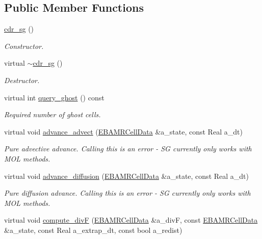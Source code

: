 \subsection*{Public Member Functions}
\begin{DoxyCompactItemize}
\item 
\hyperlink{classcdr__sg_a713c1b0970e68f90ddd7215e846f69a8}{cdr\+\_\+sg} ()
\begin{DoxyCompactList}\small\item\em Constructor. \end{DoxyCompactList}\item 
virtual \hyperlink{classcdr__sg_a507b966f96d85af4cc84c1f7e81f5f1a}{$\sim$cdr\+\_\+sg} ()
\begin{DoxyCompactList}\small\item\em Destructor. \end{DoxyCompactList}\item 
virtual int \hyperlink{classcdr__sg_abecf3d6b57505ca18e33bbbe25ad4de1}{query\+\_\+ghost} () const 
\begin{DoxyCompactList}\small\item\em Required number of ghost cells. \end{DoxyCompactList}\item 
virtual void \hyperlink{classcdr__sg_a3471b189df0a8a66e795b53426d6253f}{advance\+\_\+advect} (\hyperlink{type__definitions_8H_a7e610f301989e5e07781c5e338bdb7c3}{E\+B\+A\+M\+R\+Cell\+Data} \&a\+\_\+state, const Real a\+\_\+dt)
\begin{DoxyCompactList}\small\item\em Pure advective advance. Calling this is an error -\/ SG currently only works with M\+OL methods. \end{DoxyCompactList}\item 
virtual void \hyperlink{classcdr__sg_a2c035c0a7591cb050e23babe7becba87}{advance\+\_\+diffusion} (\hyperlink{type__definitions_8H_a7e610f301989e5e07781c5e338bdb7c3}{E\+B\+A\+M\+R\+Cell\+Data} \&a\+\_\+state, const Real a\+\_\+dt)
\begin{DoxyCompactList}\small\item\em Pure diffusion advance. Calling this is an error -\/ SG currently only works with M\+OL methods. \end{DoxyCompactList}\item 
virtual void \hyperlink{classcdr__sg_adbd13053682e21dd46a161d326e81a2d}{compute\+\_\+divF} (\hyperlink{type__definitions_8H_a7e610f301989e5e07781c5e338bdb7c3}{E\+B\+A\+M\+R\+Cell\+Data} \&a\+\_\+divF, const \hyperlink{type__definitions_8H_a7e610f301989e5e07781c5e338bdb7c3}{E\+B\+A\+M\+R\+Cell\+Data} \&a\+\_\+state, const Real a\+\_\+extrap\+\_\+dt, const bool a\+\_\+redist)

\end{DoxyCompactItemize}
